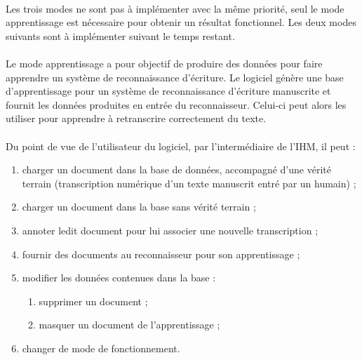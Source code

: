 \paragraph{}
Les trois modes ne sont pas à implémenter avec la même priorité, seul le mode
apprentissage est nécessaire pour obtenir un résultat fonctionnel. Les deux
modes suivants sont à implémenter suivant le temps restant.

\paragraph{}
Le mode apprentissage a pour objectif de produire des données pour faire apprendre un système de reconnaissance d’écriture. 
Le logiciel génère une base d’apprentissage pour un
système de reconnaissance d’écriture manuscrite et fournit les données
produites en entrée du reconnaisseur. Celui-ci peut alors les utiliser pour
apprendre à retranscrire correctement du texte.

\paragraph{}
Du point de vue de l'utilisateur du logiciel, par l’intermédiaire de l’IHM, il
peut :
\begin{enumerate}
\item charger un document dans la base de données, accompagné d’une vérité
terrain (transcription numérique d'un texte manuscrit entré par un humain) ;
\item charger un document dans la base sans vérité terrain ;
\item annoter ledit document pour lui associer une nouvelle transcription ;
\item fournir des documents au reconnaisseur pour son apprentissage ;
\item modifier les données contenues dans la base :
\begin{enumerate}
\item supprimer un document ;
\item masquer un document de l’apprentissage ;
\end{enumerate}
\item changer de mode de fonctionnement.
\end{enumerate}

\newpage

